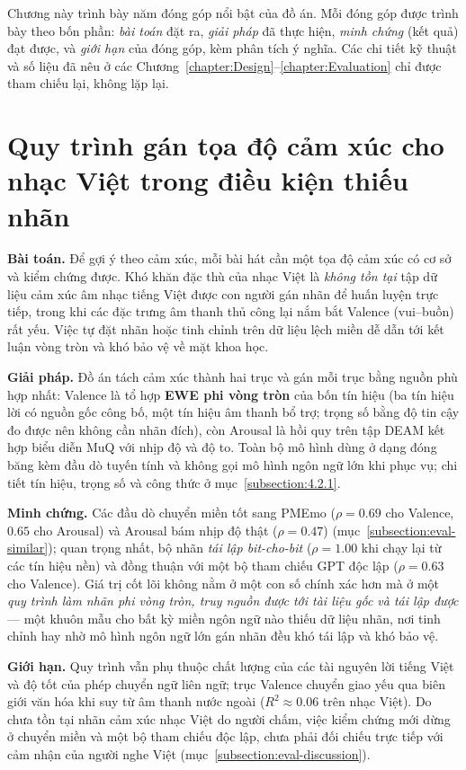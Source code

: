 \documentclass[../DoAn.tex]{subfiles}
\begin{document}
Chương này trình bày năm đóng góp nổi bật của đồ án. Mỗi đóng góp được trình bày theo bốn phần: \textit{bài toán} đặt ra, \textit{giải pháp} đã thực hiện, \textit{minh chứng} (kết quả) đạt được, và \textit{giới hạn} của đóng góp, kèm phân tích ý nghĩa. Các chi tiết kỹ thuật và số liệu đã nêu ở các Chương~\ref{chapter:Design}--\ref{chapter:Evaluation} chỉ được tham chiếu lại, không lặp lại.

\section{Quy trình gán tọa độ cảm xúc cho nhạc Việt trong điều kiện thiếu nhãn}
\label{section:5.1}
\textbf{Bài toán.} Để gợi ý theo cảm xúc, mỗi bài hát cần một tọa độ cảm xúc có cơ sở và kiểm chứng được. Khó khăn đặc thù của nhạc Việt là \textit{không tồn tại} tập dữ liệu cảm xúc âm nhạc tiếng Việt được con người gán nhãn để huấn luyện trực tiếp, trong khi các đặc trưng âm thanh thủ công lại nắm bắt Valence (vui--buồn) rất yếu. Việc tự đặt nhãn hoặc tinh chỉnh trên dữ liệu lệch miền dễ dẫn tới kết luận vòng tròn và khó bảo vệ về mặt khoa học.

\textbf{Giải pháp.} Đồ án tách cảm xúc thành hai trục và gán mỗi trục bằng nguồn phù hợp nhất: Valence là tổ hợp \textbf{EWE phi vòng tròn} của bốn tín hiệu (ba tín hiệu lời có nguồn gốc công bố, một tín hiệu âm thanh bổ trợ; trọng số bằng độ tin cậy đo được nên không cần nhãn đích), còn Arousal là hồi quy trên tập DEAM kết hợp biểu diễn MuQ với nhịp độ và độ to. Toàn bộ mô hình dùng ở dạng đóng băng kèm đầu dò tuyến tính và không gọi mô hình ngôn ngữ lớn khi phục vụ; chi tiết tín hiệu, trọng số và công thức ở mục~\ref{subsection:4.2.1}.

\textbf{Minh chứng.} Các đầu dò chuyển miền tốt sang PMEmo ($\rho = 0.69$ cho Valence, $0.65$ cho Arousal) và Arousal bám nhịp độ thật ($\rho = 0.47$) (mục~\ref{subsection:eval-similar}); quan trọng nhất, bộ nhãn \textit{tái lập bit-cho-bit} ($\rho = 1.00$ khi chạy lại từ các tín hiệu nền) và đồng thuận với một bộ tham chiếu GPT độc lập ($\rho = 0.63$ cho Valence). Giá trị cốt lõi không nằm ở một con số chính xác hơn mà ở một \textit{quy trình làm nhãn phi vòng tròn, truy nguồn được tới tài liệu gốc và tái lập được} --- một khuôn mẫu cho bất kỳ miền ngôn ngữ nào thiếu dữ liệu nhãn, nơi tinh chỉnh hay nhờ mô hình ngôn ngữ lớn gán nhãn đều khó tái lập và khó bảo vệ.

\textbf{Giới hạn.} Quy trình vẫn phụ thuộc chất lượng của các tài nguyên lời tiếng Việt và độ tốt của phép chuyển ngữ liên ngữ; trục Valence chuyển giao yếu qua biên giới văn hóa khi suy từ âm thanh nước ngoài ($R^2 \approx 0.06$ trên nhạc Việt). Do chưa tồn tại nhãn cảm xúc nhạc Việt do người chấm, việc kiểm chứng mới dừng ở chuyển miền và một bộ tham chiếu độc lập, chưa phải đối chiếu trực tiếp với cảm nhận của người nghe Việt (mục~\ref{subsection:eval-discussion}).
\end{document}
